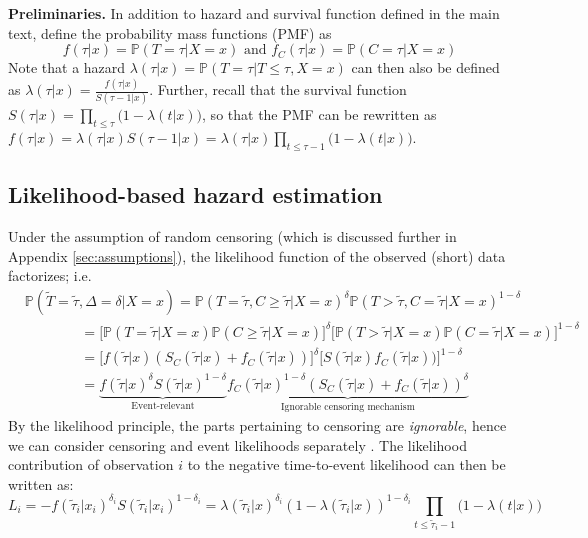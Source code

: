\documentclass{article}
\newcommand{\PR}{{\mathbb P}}
\begin{document}
\textbf{Preliminaries.}  In addition to hazard and survival function defined in the main text, define the probability mass  functions (PMF) as 
\begin{equation}
    f(\tau|x) = \PR(T=\tau|X=x) \text{ and }  f_C(\tau|x) = \PR(C=\tau|X=x) 
\end{equation}
Note that a hazard $\lambda(\tau|x)=\PR(T=\tau|T\leq \tau, X=x)$ can then also be defined as $\lambda(\tau|x)=\frac{f(\tau|x)}{S(\tau-1|x)}$. Further, recall that the survival function $S(\tau|x)=\prod_{t \leq \tau}\big(1 - \lambda(t|x)\big)$, so that the PMF can be rewritten as $f(\tau|x)=\lambda(\tau|x)S(\tau-1|x)=\lambda(\tau|x)\prod_{t \leq \tau-1}\big(1 - \lambda(t|x)\big)$.


\subsection{Likelihood-based hazard estimation}
Under the assumption of random censoring (which is discussed further in Appendix \ref{sec:assumptions}), the likelihood function of the observed (short) data factorizes; i.e. 
\begin{equation*}
\begin{split}
    &\PR(\tilde{T}=\tilde{\tau}, \Delta=\delta|X=x) = \PR(T=\tilde{\tau}, C \geq \tilde{\tau}|X=x)^\delta  \PR(T > \tilde{\tau}, C =\tilde{\tau}|X=x)^{1-\delta}  \\
    &~~~~~~~~~~~~~~~~~~=\big[\PR(T=\tilde{\tau}|X=x) \PR(C\geq \tilde{\tau}|X=x)\big]^\delta \big[\PR(T>\tilde{\tau}|X=x) \PR(C= \tilde{\tau}|X=x)\big]^{1-\delta}  \\
    &~~~~~~~~~~~~~~~~~~= \big[f(\tilde{\tau}|x)(S_C(\tilde{\tau}|x) + f_C(\tilde{\tau}|x))\big]^\delta \big[S(\tilde{\tau}|x)f_C(\tilde{\tau}|x))\big]^{1-\delta} \\
    &~~~~~~~~~~~~~~~~~~= \underbrace{f(\tilde{\tau}|x)^\delta S(\tilde{\tau}|x)^{1-\delta}}_{\text{Event-relevant}} \underbrace{f_C(\tilde{\tau}|x)^{1-\delta}(S_C(\tilde{\tau}|x)+f_C(\tilde{\tau}|x))^\delta}_{\text{Ignorable censoring mechanism}}
\end{split}
\end{equation*}
By the likelihood principle, the parts pertaining to censoring are \textit{ignorable}, hence we can consider censoring and event likelihoods separately \cite{rubin1976inference}. The likelihood contribution of observation $i$ to the negative time-to-event likelihood can then be written as:
\begin{equation}
    L_i= - f(\tilde{\tau}_i|x_i)^{\delta_i} S(\tilde{\tau}_i|x_i)^{1-\delta_i}
    = \lambda(\tilde{\tau}_i|x)^{\delta_i} (1-\lambda(\tilde{\tau}_i|x))^{1-\delta_i} \prod_{t \leq \tilde{\tau}_i-1}\big(1 - \lambda(t|x)\big)
\end{equation}
\end{document}

